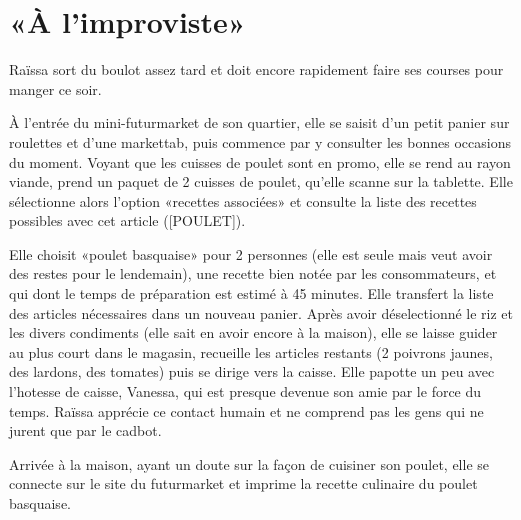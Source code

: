 \section{«À l'improviste»}

Raïssa sort du boulot assez tard et doit encore rapidement faire ses courses pour manger ce soir.
\par
À l'entrée du mini-futurmarket de son quartier, elle se saisit d'un petit panier sur roulettes et d'une markettab, puis commence par y consulter les bonnes occasions du moment.
Voyant que les cuisses de poulet sont en promo, elle se rend au rayon viande, prend un paquet de 2 cuisses de poulet, qu'elle scanne sur la tablette.
Elle sélectionne alors l'option «recettes associées» et consulte la liste des recettes possibles avec cet article ([POULET]).

Elle choisit «poulet basquaise» pour 2 personnes (elle est seule mais veut avoir des restes pour le lendemain), une recette bien notée par les consommateurs, et qui dont le temps de préparation est estimé à 45 minutes.
Elle transfert la liste des articles nécessaires dans un nouveau panier.
Après avoir déselectionné le riz et les divers condiments (elle sait en avoir encore à la maison), elle se laisse guider au plus court dans le magasin, recueille les articles restants (2 poivrons jaunes, des lardons, des tomates) puis se dirige vers la caisse.
Elle papotte un peu avec l'hotesse de caisse, Vanessa, qui est presque devenue son amie par le force du temps. 
Raïssa apprécie ce contact humain et ne comprend pas les gens qui ne jurent que par le cadbot.
\par
Arrivée à la maison, ayant un doute sur la façon de cuisiner son poulet, elle se connecte sur le site du futurmarket et imprime la recette culinaire du poulet basquaise.

